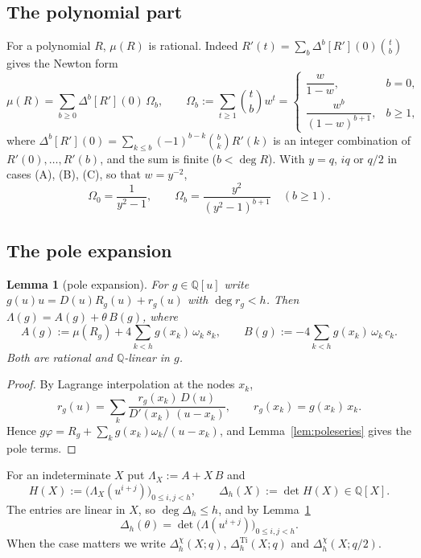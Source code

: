 \documentclass[11pt]{amsart}
\newtheorem{lemma}[theorem]{Lemma}
\theoremstyle{definition}
\theoremstyle{remark}
\numberwithin{equation}{section}
\newcommand{\QQ}{\mathbb{Q}}
\newcommand{\Ti}{\operatorname{Ti}}
\begin{document}
\subsection{The polynomial part}
For a polynomial $R$, $\mu(R)$ is rational. Indeed $R'(t)=\sum_b\Delta^b[R'](0)\binom tb$ gives the Newton form
\begin{equation}\label{eq:newton}
  \mu(R)=\sum_{b\ge0}\Delta^b[R'](0)\,\Omega_b,\qquad
  \Omega_b:=\sum_{t\ge1}\binom tbw^t=\begin{cases}\dfrac{w}{1-w},&b=0,\\[6pt] \dfrac{w^b}{(1-w)^{b+1}},&b\ge1,\end{cases}
\end{equation}
where $\Delta^b[R'](0)=\sum_{k\le b}(-1)^{b-k}\binom bkR'(k)$ is an integer combination of $R'(0),\dots,R'(b)$, and the sum
is finite ($b<\deg R$). With $y=q$, $iq$ or $q/2$ in cases (A), (B), (C), so that $w=y^{-2}$,
\begin{equation}\label{eq:Omega}
  \Omega_0=\frac1{y^2-1},\qquad \Omega_b=\frac{y^2}{(y^2-1)^{b+1}}\quad(b\ge1).
\end{equation}

\subsection{The pole expansion}

\begin{lemma}[pole expansion]\label{lem:pole}
For $g\in\QQ[u]$ write $g(u)u=D(u)R_g(u)+r_g(u)$ with $\deg r_g<h$. Then $\Lambda(g)=A(g)+\theta\,B(g)$, where
\[
  A(g):=\mu(R_g)+4\sum_{k<h}g(x_k)\,\omega_k\,s_k,\qquad
  B(g):=-4\sum_{k<h}g(x_k)\,\omega_k\,c_k .
\]
Both are rational and $\QQ$-linear in $g$.
\end{lemma}

\begin{proof}
By Lagrange interpolation at the nodes $x_k$,
\[
  r_g(u)=\sum_k\frac{r_g(x_k)\,D(u)}{D'(x_k)\,(u-x_k)},\qquad r_g(x_k)=g(x_k)\,x_k .
\]
Hence $g\varphi=R_g+\sum_kg(x_k)\omega_k/(u-x_k)$, and Lemma~\ref{lem:poleseries} gives the pole terms.
\end{proof}

For an indeterminate $X$ put $\Lambda_X:=A+X\,B$ and
\[
  H(X):=\bigl(\Lambda_X(u^{i+j})\bigr)_{0\le i,j<h},\qquad \Delta_h(X):=\det H(X)\in\QQ[X].
\]
The entries are linear in $X$, so $\deg\Delta_h\le h$, and by Lemma~\ref{lem:pole}
\begin{equation}\label{eq:value}
  \Delta_h(\theta)=\det\bigl(\Lambda(u^{i+j})\bigr)_{0\le i,j<h}.
\end{equation}
When the case matters we write $\Delta^{\chi}_h(X;q)$, $\Delta^{\Ti}_h(X;q)$ and $\Delta^{\chi}_h(X;q/2)$.
\end{document}
